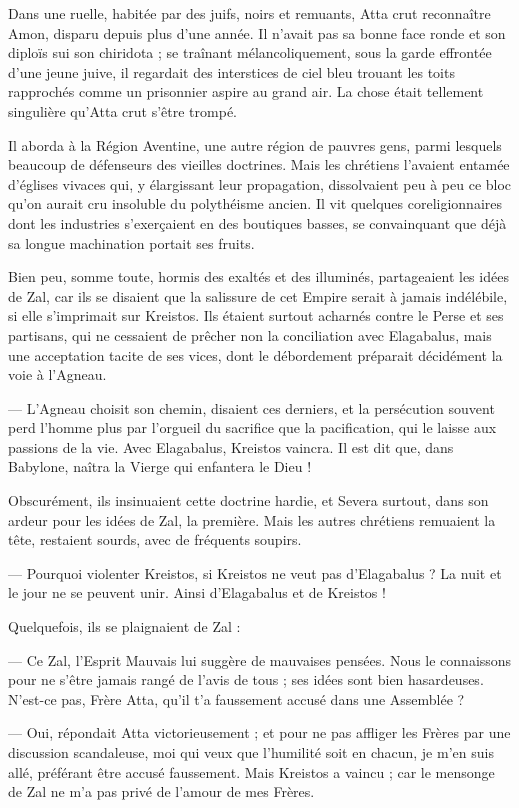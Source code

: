 \documentclass[a4paper, 11pt, oneside, polutonikogreek, french]{article}
\begin{document}
Dans une ruelle, habitée par des juifs, noirs et remuants, Atta crut reconnaître Amon, disparu depuis plus d'une année. Il n'avait pas sa bonne face ronde et son diploïs sui son chiridota ; se traînant mélancoliquement, sous la garde effrontée d'une jeune juive, il regardait des interstices de ciel bleu trouant les toits rapprochés comme un prisonnier aspire au grand air. La chose était tellement singulière qu'Atta crut s'être trompé.

Il aborda à la Région Aventine, une autre région de pauvres gens, parmi lesquels beaucoup de défenseurs des vieilles doctrines. Mais les chrétiens l'avaient entamée d'églises vivaces qui, y élargissant leur propagation, dissolvaient peu à peu ce bloc qu'on aurait cru insoluble du polythéisme ancien. Il vit quelques coreligionnaires dont les industries s'exerçaient en des boutiques basses, se convainquant que déjà sa longue machination portait ses fruits.

Bien peu, somme toute, hormis des exaltés et des illuminés, partageaient les idées de Zal, car ils se disaient que la salissure de cet Empire serait à jamais indélébile, si elle s'imprimait sur Kreistos. Ils étaient surtout acharnés contre le Perse et ses partisans, qui ne cessaient de prêcher non la conciliation avec Elagabalus, mais une acceptation tacite de ses vices, dont le débordement préparait décidément la voie à l'Agneau.

--- L'Agneau choisit son chemin, disaient ces derniers, et la persécution souvent perd l'homme plus par l'orgueil du sacrifice que la pacification, qui le laisse aux passions de la vie. Avec Elagabalus, Kreistos vaincra. Il est dit que, dans Babylone, naîtra la Vierge qui enfantera le Dieu !

Obscurément, ils insinuaient cette doctrine hardie, et Severa surtout, dans son ardeur pour les idées de Zal, la première. Mais les autres chrétiens remuaient la tête, restaient sourds, avec de fréquents soupirs.

--- Pourquoi violenter Kreistos, si Kreistos ne veut pas d’Elagabalus ? La nuit et le jour ne se peuvent unir. Ainsi d'Elagabalus et de Kreistos !

Quelquefois, ils se plaignaient de Zal :

--- Ce Zal, l'Esprit Mauvais lui suggère de mauvaises pensées. Nous le connaissons pour ne s'être jamais rangé de l'avis de tous ; ses idées sont bien hasardeuses. N'est-ce pas, Frère Atta, qu'il t'a faussement accusé dans une Assemblée ?

--- Oui, répondait Atta victorieusement ; et pour ne pas affliger les Frères par une discussion scandaleuse, moi qui veux que l'humilité soit en chacun, je m'en suis allé, préférant être accusé faussement. Mais Kreistos a vaincu ; car le mensonge de Zal ne m'a pas privé de l'amour de mes Frères.
\end{document}
